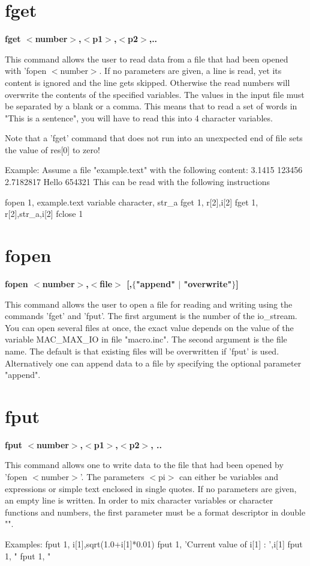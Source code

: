\section{fget}
{\bf fget $ <$number$> $,$ <$p1$> $,$ <$p2$> $,.. \par }
\par
\vspace{3pt}
This command allows the user to read data from a file that had been 
opened with 'fopen $ <$number$> $. If no parameters are given, a line is 
read, yet its content is ignored and the line gets skipped. 
Otherwise the read numbers will overwrite the contents of the 
specified variables. 
The values in the input file must be separated by a blank or a comma. 
This means that to read a set of words in "This is a sentence", you 
will have to read this into 4 character variables. 
\par
Note that a 'fget' command that does not run into an unexpected 
end of file sets the value of res[0] to zero! 
\par
Example: 
Assume a file "example.text" with the following content: 
3.1415  123456 
2.7182817 Hello 654321 
This can be read with the following instructions 
\par
fopen 1, example.text 
variable character, str\_a 
fget 1, r[2],i[2] 
fget 1, r[2],str\_a,i[2] 
fclose 1 
\section{fopen}
{\bf fopen $ <$number$> $,$ <$file$> $ [,$ \{$"append" $| $ "overwrite"$\} $] \par }
\par
\vspace{3pt}
This command allows the user to open a file for reading and writing 
using the commands 'fget' and 'fput'. The first argument is the number 
of the io\_stream. You can open several files at once, the exact value 
depends on the value of the variable MAC\_MAX\_IO in file "macro.inc". 
The second argument is the file name. The default is that existing 
files will be overwritten if 'fput' is used. Alternatively one can 
append data to a file by specifying the optional parameter "append". 
\section{fput}
{\bf fput $ <$number$> $,$ <$p1$> $,$ <$p2$> $, .. \par }
\par
\vspace{3pt}
This command allows one to write data to the file that had been opened 
by 'fopen $ <$number$> $'. The parameters $ <$pi$> $ can either be variables and 
expressions or simple text enclosed in single quotes. If no parameters 
are given, an empty line is written. 
In order to mix character variables or character functions and numbers, 
the first parameter must be a format descriptor in double "". 
\par
\begin{MacVerbatim}
Examples:  fput 1, i[1],sqrt(1.0+i[1]*0.01)
           fput 1, 'Current value of i[1] : ',i[1]
           fput 1, "%
           fput 1, "%
\end{MacVerbatim}
